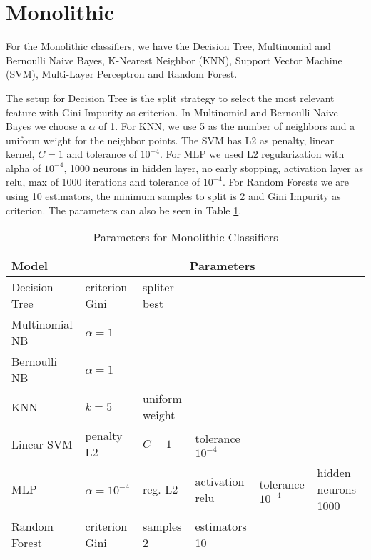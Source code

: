 \section{Monolithic}\label{mono}

For the Monolithic classifiers, we have the Decision Tree, Multinomial and Bernoulli Naive Bayes, K-Nearest Neighbor (KNN), Support Vector Machine (SVM), Multi-Layer Perceptron and Random Forest.

The setup for Decision Tree is the split strategy to select the most relevant feature with Gini Impurity as criterion. In Multinomial and Bernoulli Naive Bayes we choose a $\alpha$ of 1. For KNN, we use 5 as the number of neighbors and a uniform weight for the neighbor points. The SVM has L2 as penalty, linear kernel, $C = 1$ and tolerance of $10^{-4}$. For MLP we used L2 regularization with alpha of $10^{-4}$, 1000 neurons in hidden layer, no early stopping, activation layer as relu, max of 1000 iterations and tolerance of $10^{-4}$. For Random Forests we are using 10 estimators, the minimum samples to split is 2 and Gini Impurity as criterion. The parameters can also be seen in Table \ref{table:monolithic_params}.

\begin{table}[h!]
    \centering
    \renewcommand{\arraystretch}{1.8}
    \begin{tabular}{ p{4cm}p{1.62cm}|p{1.5cm}|p{1.5cm}|p{1.5cm}|p{1.5cm} }
        \toprule
        Model & \multicolumn{5}{c}{Parameters} \\
        \midrule
        Decision Tree & criterion Gini & spliter best & & &\\
        Multinomial NB & $\alpha = 1$ & & & &\\
        Bernoulli NB & $\alpha = 1$ & & & &\\
        KNN & $ k = 5 $ & uniform weight & & &\\
        Linear SVM & penalty L2 & $C = 1$ & tolerance $10^{-4}$ & &\\
        MLP  & $ \alpha = 10^{-4} $ & reg. L2  & activation relu & tolerance $10^{-4}$ & hidden neurons 1000 \\
        Random Forest & criterion Gini & samples 2 & estimators 10 & & \\ [1ex]
        \bottomrule
        \end{tabular}
        \caption{%
        Parameters for Monolithic Classifiers%
        }\label{table:monolithic_params}
\end{table}

